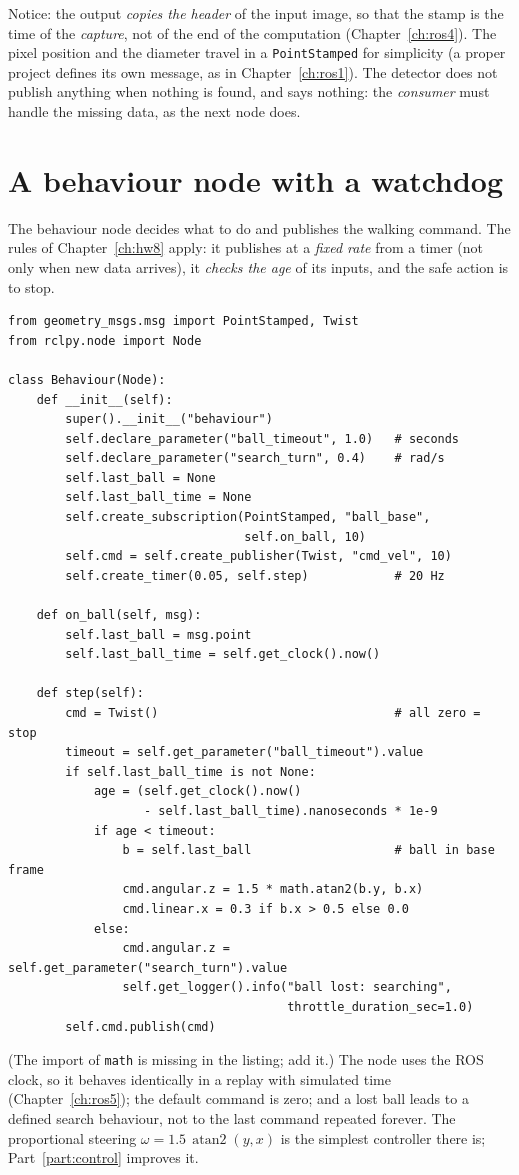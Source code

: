 Notice: the output \emph{copies the header} of the input image, so that the stamp is the time of the \emph{capture}, not of the end of the computation (Chapter~\ref{ch:ros4}). The pixel position and the diameter travel in a \verb!PointStamped! for simplicity (a proper project defines its own message, as in Chapter~\ref{ch:ros1}). The detector does not publish anything when nothing is found, and says nothing: the \emph{consumer} must handle the missing data, as the next node does.

\section*{A behaviour node with a watchdog}
The behaviour node decides what to do and publishes the walking command. The rules of Chapter~\ref{ch:hw8} apply: it publishes at a \emph{fixed rate} from a timer (not only when new data arrives), it \emph{checks the age} of its inputs, and the safe action is to stop.
\begin{verbatim}
from geometry_msgs.msg import PointStamped, Twist
from rclpy.node import Node

class Behaviour(Node):
    def __init__(self):
        super().__init__("behaviour")
        self.declare_parameter("ball_timeout", 1.0)   # seconds
        self.declare_parameter("search_turn", 0.4)    # rad/s
        self.last_ball = None
        self.last_ball_time = None
        self.create_subscription(PointStamped, "ball_base",
                                 self.on_ball, 10)
        self.cmd = self.create_publisher(Twist, "cmd_vel", 10)
        self.create_timer(0.05, self.step)            # 20 Hz

    def on_ball(self, msg):
        self.last_ball = msg.point
        self.last_ball_time = self.get_clock().now()

    def step(self):
        cmd = Twist()                                 # all zero = stop
        timeout = self.get_parameter("ball_timeout").value
        if self.last_ball_time is not None:
            age = (self.get_clock().now()
                   - self.last_ball_time).nanoseconds * 1e-9
            if age < timeout:
                b = self.last_ball                    # ball in base frame
                cmd.angular.z = 1.5 * math.atan2(b.y, b.x)
                cmd.linear.x = 0.3 if b.x > 0.5 else 0.0
            else:
                cmd.angular.z = self.get_parameter("search_turn").value
                self.get_logger().info("ball lost: searching",
                                       throttle_duration_sec=1.0)
        self.cmd.publish(cmd)
\end{verbatim}
(The import of \verb!math! is missing in the listing; add it.) The node uses the ROS clock, so it behaves identically in a replay with simulated time (Chapter~\ref{ch:ros5}); the default command is zero; and a lost ball leads to a defined search behaviour, not to the last command repeated forever. The proportional steering $\omega=1.5\,\operatorname{atan2}(y,x)$ is the simplest controller there is; Part~\ref{part:control} improves it.

